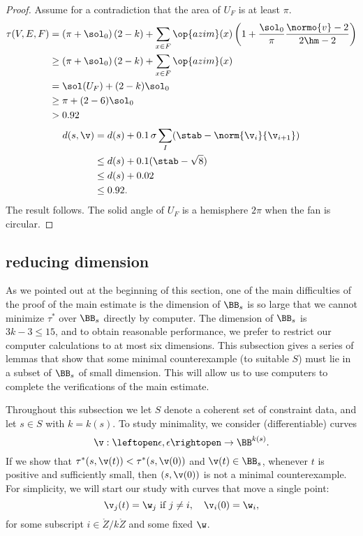 \begin{proof}
Assume for a contradiction that the area of $U_F$ is at least $\pi$.
\begin{align*}
\tau(V,E,F) &=\left(\pi+{\sol_0}\right) (2- k)+ \sum_{x\in F}\op{azim}(x)
\left(1 + \dfrac{\sol_0}{\pi}  \dfrac{\normo{v}-2}{2\hm-2}\right) \\
  &\ge\left(\pi+{\sol_0}\right) (2- k)+ \sum_{x\in F} \op{azim}(x) \\
  &=\sol(U_F) + (2-k)\sol_0\\
  &\ge \pi + (2-6)\sol_0 \\
  &> 0.92
\end{align*}
\begin{align*}
d(s,\v) &= d(s) + 0.1\, \sigma \sum_I (\stab  - \norm{\v_i}{\v_{i+1}}) \\
   &\le d(s) + 0.1 (\stab - \sqrt{8}) \\
   &\le d(s) + 0.02\\
    &\le 0.92.
\end{align*}
The result follows.  The solid angle of $U_F$ is 
a hemisphere $2\pi$ when the fan is circular.
\end{proof}

\subsection{reducing dimension}

As we pointed out at the beginning of this section, one of the main
difficulties of the proof of the main estimate is the dimension of
$\BB_s$ is so large that we cannot minimize $\tau^*$ over $\BB_s$ directly
by computer.  The dimension of $\BB_s$ is $ 3 k- 3 \le 15$, and to
obtain reasonable performance, we prefer to restrict our computer
calculations to at most six dimensions.  This subsection gives a
series of lemmas that show that some minimal counterexample (to
suitable $S$) must lie in a subset of $\BB_s$ of small dimension.
This will allow us to use computers to complete the verifications of
the main estimate.

Throughout this subsection we let $S$ denote a coherent set of constraint
data, and let $s\in S$ with $k=k(s)$.
To study minimality, we consider (differentiable) curves
\[
\v:\leftopen\epsilon,\epsilon\rightopen\to \BB^{k(s)}.
\]
If we show that $\tau^*(s,\v(t))<\tau^*(s,\v(0))$ and $\v(t)\in\BB_s$,
whenever $t$ is positive and sufficiently small, then
 $(s,\v(0))$ is not a minimal counterexample.
For simplicity, we will start our study with curves that move a single point:
\begin{equation}\label{eqn:move1}
   \v_j(t)= \w_j\text{ if } j\ne i,\quad \v_i(0) = \w_i,
\end{equation}
for some subscript $i\in \ring{Z}/k\ring{Z}$ and some fixed $\w$.

